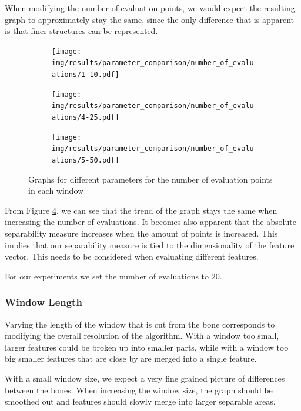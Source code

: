 \documentclass[pdftex,12pt,a4paper]{report}
\begin{document}
When modifying the number of evaluation points, we would expect the resulting graph to approximately stay the same, since the only difference that is apparent is that finer structures can be represented.

\begin{figure}[h]
	\centering
	\begin{subfigure}[b]{0.32\textwidth}
		\centering
		\texttt{[image: img/results/parameter\_comparison/number\_of\_evaluations/1-10.pdf]}
		\label{fig:number-evaluations-0}
	\end{subfigure}
	\begin{subfigure}[b]{0.32\textwidth}
		\centering
		\texttt{[image: img/results/parameter\_comparison/number\_of\_evaluations/4-25.pdf]}
		\label{fig:number-evaluations-1}
	\end{subfigure}
	\begin{subfigure}[b]{0.32\textwidth}
		\centering
		\texttt{[image: img/results/parameter\_comparison/number\_of\_evaluations/5-50.pdf]}
		\label{fig:number-evaluations-2}
	\end{subfigure}
	\caption{Graphs for different parameters for the number of evaluation points in each window}
	\label{fig:number-evaluations}
\end{figure}

From Figure \ref{fig:number-evaluations}, we can see that the trend of the graph stays the same when increasing the number of evaluations. It becomes also apparent that the absolute separability measure increases when the amount of points is increased. This implies that our separability measure is tied to the dimensionality of the feature vector. This needs to be considered when evaluating different features.

For our experiments we set the number of evaluations to $20$.

\subsubsection{Window Length}

Varying the length of the window that is cut from the bone corresponds to modifying the overall resolution of the algorithm. With a window too small, larger features could be broken up into smaller parts, while with a window too big smaller features that are close by are merged into a single feature.

With a small window size, we expect a very fine grained picture of differences between the bones. When increasing the window size, the graph should be smoothed out and features should slowly merge into larger separable areas.
\end{document}
